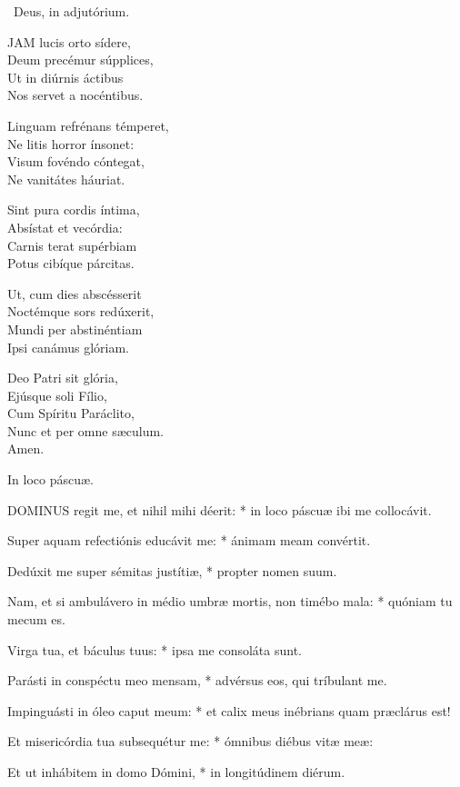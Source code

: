 \V\ Deus, in adjutórium.


\lettrine[lines=2]{J}{AM} lucis orto sídere,\\
Deum precémur súpplices,\\
Ut in diúrnis áctibus\\
Nos servet a nocéntibus.

Linguam refrénans témperet,\\
Ne litis horror ínsonet:\\
Visum fovéndo cóntegat,\\
Ne vanitátes háuriat.

Sint pura cordis íntima,\\
Absístat et vecórdia:\\
Carnis terat supérbiam\\
Potus cibíque párcitas.

Ut, cum dies abscésserit\\
Noctémque sors redúxerit,\\
Mundi per abstinéntiam\\
Ipsi canámus glóriam.

Deo Patri sit glória,\\
Ejúsque soli Fílio,\\
Cum Spíritu Paráclito,\\
Nunc et per omne sæculum.\\
Amen.

 In loco páscuæ.


\lettrine[lines=2]{D}{OMINUS} regit me, et nihil mihi déerit: * in loco páscuæ ibi me collocávit.

Super aquam refectiónis educávit me: * ánimam meam convértit.

Dedúxit me super sémitas justítiæ, * propter nomen suum.

Nam, et si ambulávero in médio umbræ mortis, non timébo mala: * quóniam tu mecum es.

Virga tua, et báculus tuus: * ipsa me consoláta sunt.

Parásti in conspéctu meo mensam, * advérsus eos, qui tríbulant me.

Impinguásti in óleo caput meum: * et calix meus inébrians quam præclárus est!

Et misericórdia tua subsequétur me: * ómnibus diébus vitæ meæ:

Et ut inhábitem in domo Dómini, * in longitúdinem diérum.

